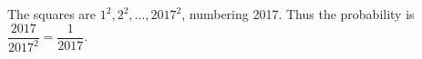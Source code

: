 The squares are $ 1^2,2^2,\ldots,2017^2 $, numbering 2017. Thus the probability is $\dfrac{2017}{2017^2}=\boxed{\dfrac{1}{2017}}$.
